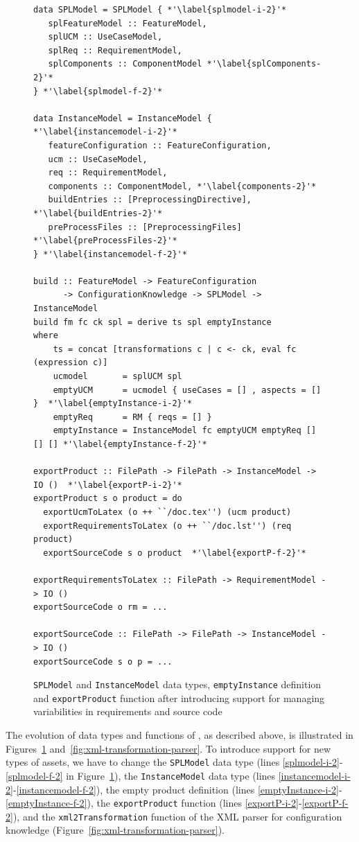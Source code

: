 \begin{figure}
\begin{lstlisting}
data SPLModel = SPLModel { *'\label{splmodel-i-2}'*
   splFeatureModel :: FeatureModel,
   splUCM :: UseCaseModel,
   splReq :: RequirementModel,
   splComponents :: ComponentModel *'\label{splComponents-2}'*
} *'\label{splmodel-f-2}'*

data InstanceModel = InstanceModel { *'\label{instancemodel-i-2}'*
   featureConfiguration :: FeatureConfiguration,
   ucm :: UseCaseModel,
   req :: RequirementModel,
   components :: ComponentModel, *'\label{components-2}'*
   buildEntries :: [PreprocessingDirective], *'\label{buildEntries-2}'*
   preProcessFiles :: [PreprocessingFiles] *'\label{preProcessFiles-2}'*
} *'\label{instancemodel-f-2}'*

build :: FeatureModel -> FeatureConfiguration 
      -> ConfigurationKnowledge -> SPLModel -> InstanceModel
build fm fc ck spl = derive ts spl emptyInstance
where
    ts = concat [transformations c | c <- ck, eval fc (expression c)]
    ucmodel       = splUCM spl
    emptyUCM      = ucmodel { useCases = [] , aspects = [] }  *'\label{emptyInstance-i-2}'*
    emptyReq      = RM { reqs = [] }
    emptyInstance = InstanceModel fc emptyUCM emptyReq [] [] [] *'\label{emptyInstance-f-2}'*

exportProduct :: FilePath -> FilePath -> InstanceModel -> IO ()  *'\label{exportP-i-2}'*
exportProduct s o product = do
  exportUcmToLatex (o ++ ``/doc.tex'') (ucm product)
  exportRequirementsToLatex (o ++ ``/doc.lst'') (req product)
  exportSourceCode s o product  *'\label{exportP-f-2}'*

exportRequirementsToLatex :: FilePath -> RequirementModel -> IO ()
exportSourceCode o rm = ...

exportSourceCode :: FilePath -> FilePath -> InstanceModel -> IO ()
exportSourceCode s o p = ...
\end{lstlisting}
\caption{\texttt{SPLModel} and \texttt{InstanceModel} data types, \texttt{emptyInstance} definition and \texttt{exportProduct} function
  after introducing support for managing variabilities in requirements and source code}
\label{fig:spl-model-with-req-and-code}
\end{figure}


The evolution of data types and functions of \hp{}, as described
above, is illustrated in Figures~\ref{fig:spl-model-with-req-and-code}
and~\ref{fig:xml-transformation-parser}. To introduce support for new
types of assets, we have to change the \texttt{SPLModel} data type (lines
\ref{splmodel-i-2}-\ref{splmodel-f-2} in
Figure~\ref{fig:spl-model-with-req-and-code}), the
\texttt{InstanceModel} data type (lines
\ref{instancemodel-i-2}-\ref{instancemodel-f-2}), the empty
product definition (lines
\ref{emptyInstance-i-2}-\ref{emptyInstance-f-2}), the
\texttt{exportProduct} function (lines
\ref{exportP-i-2}-\ref{exportP-f-2}), and the
\texttt{xml2Transformation} function of the XML parser for configuration knowledge
(Figure~\ref{fig:xml-transformation-parser}).


